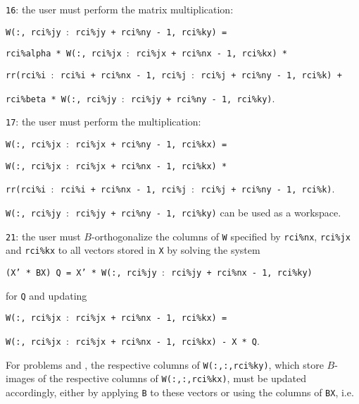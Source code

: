 \begin{description}
\begin{description}
%
\item
{\tt 16}: the user must perform the matrix multiplication:

\hspace{8mm}
{\tt W(:, rci\%jy $:$ rci\%jy + rci\%ny - 1, rci\%ky) =}

\hspace{12mm}
{\tt rci\%alpha *
W(:, rci\%jx $:$ rci\%jx + rci\%nx - 1, rci\%kx) *}

\hspace{16mm}
{\tt rr(rci\%i $:$ rci\%i + rci\%nx - 1, 
rci\%j $:$ rci\%j + rci\%ny - 1, rci\%k) + }

\hspace{12mm}
{\tt rci\%beta * W(:, rci\%jy $:$ rci\%jy + rci\%ny - 1, rci\%ky)}.
%
\item
{\tt 17}: the user must perform the multiplication:


\hspace{8mm}
{\tt W(:, rci\%jx $:$ rci\%jx + rci\%ny - 1, rci\%kx) =}

\hspace{12mm}
{\tt W(:, rci\%jx $:$ rci\%jx + rci\%nx - 1, rci\%kx) *}

\hspace{16mm}
{\tt rr(rci\%i $:$ rci\%i + rci\%nx - 1, 
rci\%j $:$ rci\%j + rci\%ny - 1, rci\%k)}.

{\tt W(:, rci\%jy $:$ rci\%jy + rci\%ny - 1, rci\%ky)}
can be used as a workspace.
%
\item
{\tt 21}: 
the user must $B$-orthogonalize
the columns of {\tt W} specified by
{\tt rci\%nx}, {\tt rci\%jx} and {\tt rci\%kx} 
to all vectors stored in {\tt X}
by solving the system

\hspace{8mm}
{\tt (X' * BX) Q = X' * W(:, rci\%jy $:$ rci\%jy + rci\%nx - 1, rci\%ky)}

for {\tt Q} and updating

\hspace{8mm}
{\tt W(:, rci\%jx $:$ rci\%jx + rci\%nx - 1, rci\%kx) =}

\hspace{12mm}
{\tt W(:, rci\%jx $:$ rci\%jx + rci\%nx - 1, rci\%kx) - X * Q}.

For problems  and ,
the respective columns of {\tt W(:,:,rci\%ky)},
which store $B$-images of the respective columns of {\tt W(:,:,rci\%kx)},
must be updated
accordingly, either by applying {\tt B} to these vectors
or using the columns of {\tt BX}, i.e.


\end{description}
\end{description}
